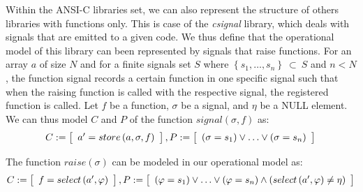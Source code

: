 \documentclass[a4paper]{llncs}
\newcommand{\blurb}[1]{{\texttt{[.. #1..]}}}
\begin{document}
Within the ANSI-C libraries set, we can also represent the structure
of others libraries with functions only. This is case of the \textit{csignal}
library, which deals with signals that are emitted to a given code.
We thus define that the operational model of this library can been represented
by signals that raise functions. For an array $a$ of size $N$ and
for a finite signals set $S$ where $\left\{s_{1},\ldots, s_{n}\right\}\:\subset\:S$
and $n < N$, the function signal records a certain function in one specific signal
such that when the raising function is called with the respective signal,
the registered function is called. Let $f$ be a function, $\sigma$ be a signal,
and $\eta$ be a NULL element. We can thus model $C$ and $P$
of the function $signal\left(\sigma, f\right)$ as:
%
\begin{equation}
\label{quantifier-free-formulae-sginal}
C := \left [ \begin{array}{ll}
                a' = store\left(a,\sigma,f\right) \\
              \end{array} \right ],  \\
P := \left [ \begin{array}{ll}
                \left(\sigma = s_{1}\right) \vee \ldots \vee \left(\sigma = s_{n}\right) \\
              \end{array} \right ]  \\
\end{equation}

The function $raise\left(\sigma\right)$ can be modeled in our operational model as:
%
\begin{equation}
\label{quantifier-free-formulae-raise}
C := \left [ \begin{array}{ll}
                f = select\left(a',\varphi\right) \\
              \end{array} \right ],  \\
P := \left [ \begin{array}{ll}
                \left(\varphi = s_{1}\right) \vee \ldots \vee \left(\varphi = s_{n}\right) \wedge \left(select\left(a',\varphi\right) \neq \eta\right) \\
              \end{array} \right ]  \\
\end{equation}
\vspace*{-4ex}
\end{document}
